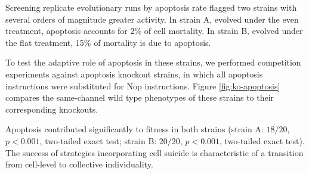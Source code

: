 Screening replicate evolutionary runs by apoptosis rate flagged two strains with several orders of magnitude greater activity.
In strain A, evolved under the even treatment, apoptosis accounts for 2\% of cell mortality.
In strain B, evolved under the flat treatment, 15\% of mortality is due to apoptosis.

To test the adaptive role of apoptosis in these strains, we performed competition experiments against apoptosis knockout strains, in which all apoptosis instructions were substituted for Nop instructions.
Figure \ref{fig:ko-apoptosis} compares the same-channel wild type phenotypes of these strains to their corresponding knockouts.

Apoptosis contributed significantly to fitness in both strains (strain A: $18/20$, $p < 0.001$, two-tailed exact test; strain B: $20/20$, $p < 0.001$, two-tailed exact test).
The success of strategies incorporating cell suicide is characteristic of a transition from cell-level to collective individuality.
